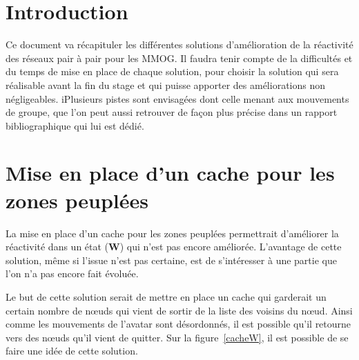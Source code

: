 \documentclass[11pt,a4paper]{article}
\begin{document}

\newpage
\tableofcontents
\newpage



\section{Introduction}
Ce document va récapituler les différentes solutions d'amélioration de la réactivité des réseaux pair à pair pour les MMOG. Il faudra tenir compte de la difficultés et du temps de mise en place de chaque solution, pour choisir la solution qui sera réalisable avant la fin du stage et qui puisse apporter des améliorations non négligeables.
iPlusieurs pistes sont envisagées dont celle menant aux mouvements de groupe, que l'on peut aussi retrouver de façon plus précise dans un rapport bibliographique qui lui est dédié.

\newpage
\section{Mise en place d'un cache pour les zones peuplées}
La mise en place d'un cache pour les zones peuplées permettrait d'améliorer la réactivité dans un état (\textbf{W}) qui n'est pas encore améliorée. L'avantage de cette solution, même si l'issue n'est pas certaine, est de s'intéresser à une partie que l'on n'a pas encore fait évoluée. 
\par Le but de cette solution serait de mettre en place un cache qui garderait un certain nombre de nœuds qui vient de sortir de la liste des voisins du nœud. Ainsi comme les mouvements de l'avatar sont désordonnés, il est possible qu'il retourne vers des nœuds qu'il vient de quitter. Sur la figure~\ref{cacheW}, il est possible de se faire une idée de cette solution.
\end{document}
